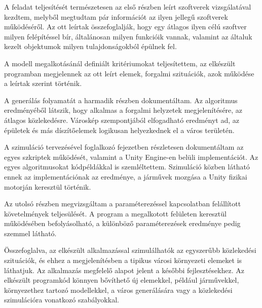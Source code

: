 
A feladat teljesítését természetesen az első részben leírt szoftverek vizsgálatával kezdtem, melyből megtudtam pár információt az ilyen jellegű szoftverek működéséről. Az ott leírtak összefoglalják, hogy egy átlagos ilyen célú szoftver milyen felépítéssel bír, általánosan milyen funkcióik vannak, valamint az általuk kezelt objektumok milyen tulajdonságokból épülnek fel.

A modell megalkotásánál definiált kritériumokat teljesítettem, az elkészült programban megjelennek az ott leírt elemek, forgalmi szituációk, azok működése a leírtak szerint történik.

A generálás folyamatát a harmadik részben dokumentáltam. Az algoritmus eredményéből látszik, hogy alkalmas a forgalmi helyzetek megjelenítésére, az átlagos közlekedésre. Városkép szempontjából elfogadható eredményt ad, az épületek és más díszítőelemek logikusan helyezkednek el a város területén.

A szimuláció tervezésével foglalkozó fejezetben részletesen dokumentáltam az egyes szkriptek működését, valamint a Unity Engine-en belüli implementációt. Az egyes algoritmusokat kódpéldákkal is szemléltettem. Szimuláció közben látható ennek az implementációnak az eredménye, a járművek mozgása a Unity fizikai motorján keresztül történik.

Az utolsó részben megvizsgáltam a paraméterezéssel kapcsolatban felállított követelmények teljesülését. A program a megalkotott felületen keresztül működésében befolyásolható, a különböző paraméterezések eredménye pedig szemmel látható.

Összefoglalva, az elkészült alkalmazással szimulálhatók az egyszerűbb közlekedési szituációk, és ehhez a megjelenítésben a tipikus városi környezeti elemeket is láthatjuk. Az alkalmazás megfelelő alapot jelent a későbbi fejlesztésekhez. Az elkészült programkód könnyen bővíthető új elemekkel, például járművekkel, környezethez tartozó modellekkel, a város generálására vagy a közlekedési szimulációra vonatkozó szabályokkal.
